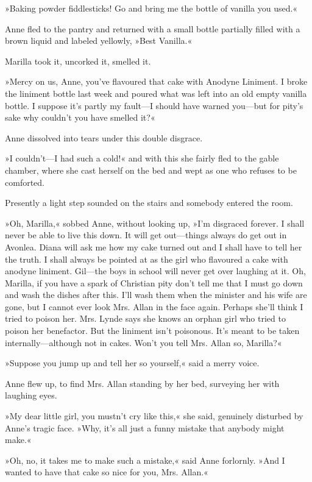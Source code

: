 »Baking powder fiddlesticks! Go and bring me the bottle of vanilla you used.«

Anne fled to the pantry and returned with a small bottle partially filled with a brown liquid and labeled yellowly, »Best Vanilla.«

Marilla took it, uncorked it, smelled it.

»Mercy on us, Anne, you've flavoured that cake with Anodyne Liniment. I broke the liniment bottle last week and poured what was left into an old empty vanilla bottle. I suppose it's partly my fault—I should have warned you—but for pity's sake why couldn't you have smelled it?«

Anne dissolved into tears under this double disgrace.

»I couldn't—I had such a cold!« and with this she fairly fled to the gable chamber, where she cast herself on the bed and wept as one who refuses to be comforted.

Presently a light step sounded on the stairs and somebody entered the room.

»Oh, Marilla,« sobbed Anne, without looking up, »I'm disgraced forever. I shall never be able to live this down. It will get out—things always do get out in Avonlea. Diana will ask me how my cake turned out and I shall have to tell her the truth. I shall always be pointed at as the girl who flavoured a cake with anodyne liniment. Gil—the boys in school will never get over laughing at it. Oh, Marilla, if you have a spark of Christian pity don't tell me that I must go down and wash the dishes after this. I'll wash them when the minister and his wife are gone, but I cannot ever look Mrs. Allan in the face again. Perhaps she'll think I tried to poison her. Mrs. Lynde says she knows an orphan girl who tried to poison her benefactor. But the liniment isn't poisonous. It's meant to be taken internally—although not in cakes. Won't you tell Mrs. Allan so, Marilla?«

»Suppose you jump up and tell her so yourself,« said a merry voice.

Anne flew up, to find Mrs. Allan standing by her bed, surveying her with laughing eyes.

»My dear little girl, you mustn't cry like this,« she said, genuinely disturbed by Anne's tragic face. »Why, it's all just a funny mistake that anybody might make.«

»Oh, no, it takes me to make such a mistake,« said Anne forlornly. »And I wanted to have that cake so nice for you, Mrs. Allan.«

